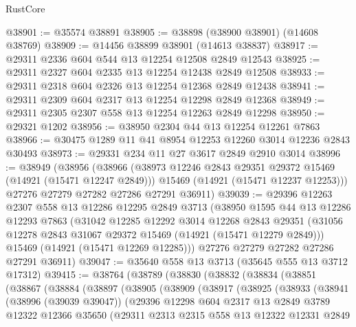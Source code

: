 \begin{lexlean}{RustCore}
\begin{coremodule}
@38901 := @35574 @38891
@38905 := @38898 (@38900 @38901) (@14608 @38769)
@38909 := @14456 @38899 @38901 (@14613 @38837)
@38917 := @29311 @2336 @604 @544 @13 @12254 @12508 @2849 @12543
@38925 := @29311 @2327 @604 @2335 @13 @12254 @12438 @2849 @12508
@38933 := @29311 @2318 @604 @2326 @13 @12254 @12368 @2849 @12438
@38941 := @29311 @2309 @604 @2317 @13 @12254 @12298 @2849 @12368
@38949 := @29311 @2305 @2307 @558 @13 @12254 @12263 @2849 @12298
@38950 := @29321 @1202
@38956 := @38950 @2304 @44 @13 @12254 @12261 @7863
@38966 := @30475 @1289 @11 @41 @8954 @12253 @12260 @3014 @12236 @2843 @30493
@38973 := @29331 @234 @11 @27 @3617 @2849 @2910 @3014
@38996 := @38949
    (@38956
      (@38966
        (@38973 @12246 @2843 @29351 @29372 @15469 (@14921 (@15471 @12247 @2849)))
        @15469
        (@14921 (@15471 @12237 @12253)))
      @27276
      @27279
      @27282
      @27286
      @27291
      @36911)
@39039 := @29396
    @12263
    @2307
    @558
    @13
    @12286
    @12295
    @2849
    @3713
    (@38950
      @1595
      @44
      @13
      @12286
      @12293
      @7863
      (@31042
        @12285
        @12292
        @3014
        @12268
        @2843
        @29351
        (@31056 @12278 @2843 @31067 @29372 @15469 (@14921 (@15471 @12279 @2849)))
        @15469
        (@14921 (@15471 @12269 @12285)))
      @27276
      @27279
      @27282
      @27286
      @27291
      @36911)
@39047 := @35640 @558 @13 @3713 (@35645 @555 @13 @3712 @17312)
@39415 := @38764
    (@38789
      (@38830
        (@38832
          (@38834
            (@38851
              (@38867
                (@38884
                  (@38897
                    (@38905
                      (@38909
                        (@38917
                          (@38925
                            (@38933
                              (@38941
                                (@38996 (@39039 @39047))
                                (@29396
                                  @12298
                                  @604
                                  @2317
                                  @13
                                  @2849
                                  @3789
                                  @12322
                                  @12366
                                  @35650
                                  (@29311
                                    @2313
                                    @2315
                                    @558
                                    @13
                                    @12322
                                    @12331
                                    @2849

\end{coremodule}
\end{lexlean}
